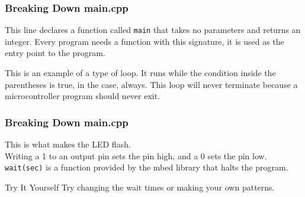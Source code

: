 \begin{frame}[fragile]
	\frametitle{Breaking Down main.cpp}
	
	This line declares a function called \lstinline{main} that takes no parameters and returns an integer.
	Every program needs a function with this signature, it is used as the entry point to the program.
	
	
	This is an example of a type of loop.
	It runs while the condition inside the parentheses is true, in the case, always.
	This loop will never terminate because a microcontroller program should never exit.
\end{frame}

\begin{frame}[fragile]
	\frametitle{Breaking Down main.cpp}
	
	This is what makes the LED flash.\\
	Writing a 1 to an output pin sets the pin high, and a 0 sets the pin low.
	\lstinline{wait(sec)} is a function provided by the mbed library that halts the program.
	\begin{block}{Try It Yourself}
		Try changing the wait times or making your own patterns.
	\end{block}
\end{frame}
